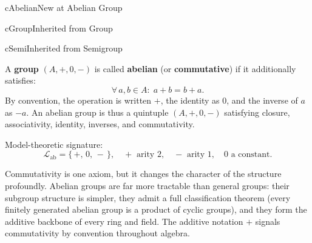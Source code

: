 \begin{bpnew}{cAbelian}{New at Abelian Group}
\end{bpnew}

\begin{bpinh}{cGroup}{Inherited from Group}
\end{bpinh}

\begin{bpinh}{cSemi}{Inherited from Semigroup}
\end{bpinh}

\begin{definition}
  A \textbf{group} $(A, +, 0, -)$ is called \textbf{abelian} (or
  \textbf{commutative}) if it additionally satisfies:
  \[
    \forall\,a, b \in A:\; a + b = b + a. \tag{Commutativity}
  \]
  By convention, the operation is written $+$, the identity as $0$, and the
  inverse of $a$ as $-a$.  An abelian group is thus a quintuple $(A, +, 0, -)$
  satisfying closure, associativity, identity, inverses, and commutativity.

  \medskip\noindent
  Model-theoretic signature:
  \[
    \mathcal{L}_{\mathrm{ab}} = \{\,+,\, 0,\, -\,\},
    \quad + \text{ arity } 2,\quad - \text{ arity } 1,\quad
    0 \text{ a constant.}
  \]
\end{definition}

\begin{remark}
  Commutativity is one axiom, but it changes the character of the structure
  profoundly.  Abelian groups are far more tractable than general groups: their
  subgroup structure is simpler, they admit a full classification theorem (every
  finitely generated abelian group is a product of cyclic groups), and they form
  the additive backbone of every ring and field.  The additive notation $+$
  signals commutativity by convention throughout algebra.
\end{remark}



